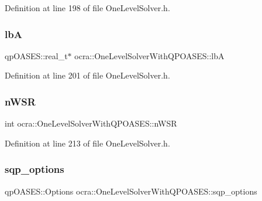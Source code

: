 Definition at line 198 of file One\+Level\+Solver.\+h.

\hypertarget{classocra_1_1OneLevelSolverWithQPOASES_a268dd33567d130672824404fdf98882a}{}\label{classocra_1_1OneLevelSolverWithQPOASES_a268dd33567d130672824404fdf98882a} 
\subsubsection{\texorpdfstring{lbA}{lbA}}
{\footnotesize\ttfamily qp\+O\+A\+S\+E\+S\+::real\+\_\+t$\ast$ ocra\+::\+One\+Level\+Solver\+With\+Q\+P\+O\+A\+S\+E\+S\+::lbA\hspace{0.3cm}{\ttfamily [protected]}}



Definition at line 201 of file One\+Level\+Solver.\+h.

\hypertarget{classocra_1_1OneLevelSolverWithQPOASES_aa9c7ddcbafeff12cacea92ac658a63d6}{}\label{classocra_1_1OneLevelSolverWithQPOASES_aa9c7ddcbafeff12cacea92ac658a63d6} 
\subsubsection{\texorpdfstring{n\+W\+SR}{nWSR}}
{\footnotesize\ttfamily int ocra\+::\+One\+Level\+Solver\+With\+Q\+P\+O\+A\+S\+E\+S\+::n\+W\+SR\hspace{0.3cm}{\ttfamily [protected]}}



Definition at line 213 of file One\+Level\+Solver.\+h.

\hypertarget{classocra_1_1OneLevelSolverWithQPOASES_ace333e6d7333a5bcd9c7be5bc7d98c7b}{}\label{classocra_1_1OneLevelSolverWithQPOASES_ace333e6d7333a5bcd9c7be5bc7d98c7b} 
\subsubsection{\texorpdfstring{sqp\+\_\+options}{sqp\_options}}
{\footnotesize\ttfamily qp\+O\+A\+S\+E\+S\+::\+Options ocra\+::\+One\+Level\+Solver\+With\+Q\+P\+O\+A\+S\+E\+S\+::sqp\+\_\+options\hspace{0.3cm}{\ttfamily [protected]}}



